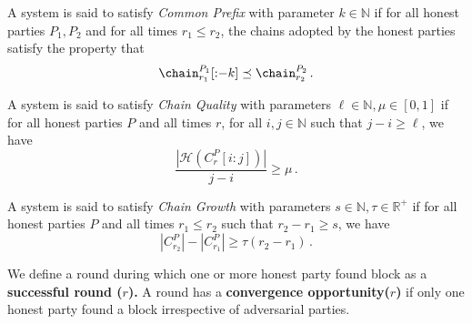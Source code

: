 \begin{definition}
  A system is said to satisfy \emph{Common Prefix} with parameter $k \in \mathbb{N}$ if
  for all honest parties $P_1, P_2$ and for all times $r_1 \leq r_2$, the chains adopted
  by the honest parties satisfy the property that
  \[
    \chain^{P_1}_{r_1}[{:}{-k}] \preceq \chain^{P_2}_{r_2}\,.
  \]
\end{definition}

\begin{definition}
  A system is said to satisfy \emph{Chain Quality} with parameters $\ell \in \mathbb{N}, \mu \in [0, 1]$ if for all honest parties $P$ and all times $r$, for all $i, j \in \mathbb{N}$ such that $j - i \geq \ell$, we have
  \[\frac{|\mathcal{H}(C^P_r[{i}{:}{j}])|}{j - i} \geq \mu\,.\]
\end{definition}

\begin{definition}
  A system is said to satisfy \emph{Chain Growth} with parameters $s \in \mathbb{N}, \tau \in \mathbb{R}^+$ if for all honest parties $P$ and all times $r_1 \leq r_2$ such that $r_2 - r_1 \geq s$, we have
  \[|C^P_{r_2}| - |C^P_{r_1}| \geq \tau (r_2 - r_1)\,.\]
\end{definition}


We define a round during which one or more honest party found block as a \textbf{successful round (\texorpdfstring{$r$}{Lg}).} A round has a \textbf{convergence opportunity(\texorpdfstring{$r$}{Lg})} if only one honest party found a block irrespective of adversarial parties.



